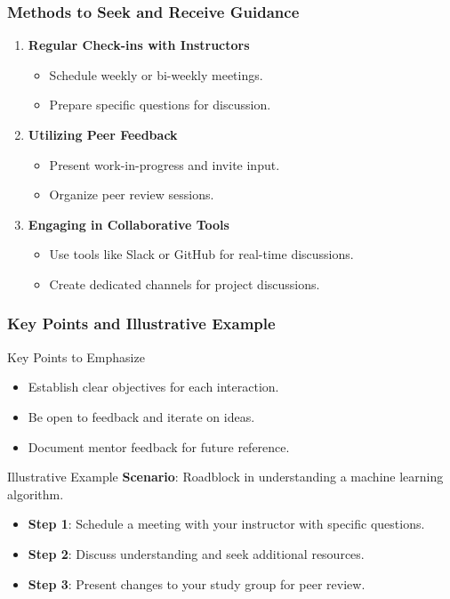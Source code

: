 \documentclass[aspectratio=169]{beamer}
\begin{document}
\begin{frame}[fragile]
    \frametitle{Methods to Seek and Receive Guidance}
    \begin{enumerate}
        \item \textbf{Regular Check-ins with Instructors}
            \begin{itemize}
                \item Schedule weekly or bi-weekly meetings.
                \item Prepare specific questions for discussion.
            \end{itemize}
        \item \textbf{Utilizing Peer Feedback}
            \begin{itemize}
                \item Present work-in-progress and invite input.
                \item Organize peer review sessions.
            \end{itemize}
        \item \textbf{Engaging in Collaborative Tools}
            \begin{itemize}
                \item Use tools like Slack or GitHub for real-time discussions.
                \item Create dedicated channels for project discussions.
            \end{itemize}
    \end{enumerate}
\end{frame}

\begin{frame}[fragile]
    \frametitle{Key Points and Illustrative Example}
    \begin{block}{Key Points to Emphasize}
        \begin{itemize}
            \item Establish clear objectives for each interaction.
            \item Be open to feedback and iterate on ideas.
            \item Document mentor feedback for future reference.
        \end{itemize}
    \end{block}
    
    \begin{block}{Illustrative Example}
        \textbf{Scenario}: Roadblock in understanding a machine learning algorithm.
        \begin{itemize}
            \item \textbf{Step 1}: Schedule a meeting with your instructor with specific questions.
            \item \textbf{Step 2}: Discuss understanding and seek additional resources.
            \item \textbf{Step 3}: Present changes to your study group for peer review.
        \end{itemize}
    \end{block}
\end{frame}
\end{document}
